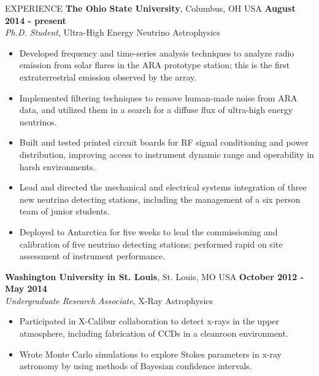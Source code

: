 \documentclass{resume} %
\begin{document}
\begin{rSection}{EXPERIENCE}
{\bf The Ohio State University}, Columbus, OH USA \hfill {\bf August 2014 - present} \\
{\em Ph.D. Student}, Ultra-High Energy Neutrino Astrophysics
\begin{itemize}
\vspace*{.05in}
\item Developed frequency and time-series analysis techniques to analyze radio emission from solar flares in the ARA prototype station; this is the first extraterrestrial emission observed by the array.
\item Implemented filtering techniques to remove human-made noise from ARA data, and utilized them in a search for a diffuse flux of ultra-high energy neutrinos.
\item Built and tested printed circuit boards for RF signal conditioning and power distribution, improving access to instrument dynamic range and operability in harsh environments.
\item Lead and directed the mechanical and electrical systems integration of three new neutrino detecting stations, including the management of a six person team of junior students.
\item Deployed to Antarctica for five weeks to lead the commissioning and calibration of five neutrino detecting stations; performed rapid on site assessment of instrument performance.
\end{itemize}

{\bf Washington University in St. Louis}, St. Louis, MO USA \hfill {\bf October 2012 - May 2014}\\
{\em Undergraduate Research Associate}, X-Ray Astrophysics
\begin{itemize}
\vspace*{.05in}
\item Participated in X-Calibur collaboration to detect x-rays in the upper atmosphere, including fabrication of CCDs in a cleanroon environment.
\item Wrote Monte Carlo simulations to explore Stokes parameters in x-ray astronomy by using methods of Bayesian confidence intervals.
\end{itemize}
\end{rSection}

\newpage
\end{document}
